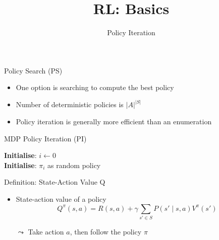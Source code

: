 \documentclass[aspectratio=169]{../latex_main/tntbeamer}  %
\title[Reinforcement Learning: Basics]{RL: Basics}
\subtitle{Policy Iteration}
\begin{document}
	
	\maketitle

\begin{frame}[c]{Policy Search (PS)}

\begin{itemize}
	\item One option is searching to compute the best policy
	\item Number of deterministic policies is $|A|^{|S|}$
	\item Policy iteration is generally more efficient than an enumeration
\end{itemize}

\end{frame}
\begin{frame}[c]{MDP Policy Iteration (PI)}

\begin{algorithm}[H]
  \caption{Policy Iteration}
  \DontPrintSemicolon
  \textbf{Initialise}: $i \leftarrow 0$\\
  \textbf{Initialise}: $\pi_i$ as random policy\\
\end{algorithm}

\end{frame}
\begin{frame}[c]{Definition: State-Action Value Q}

\begin{itemize}
	\item State-action value of a policy
	$$Q^\pi(s,a) = R(s,a) + \gamma \sum_{s' \in S} P(s' \mid s,a) V^\pi(s')$$
	\item[$\leadsto$] Take action $a$, then follow the policy $\pi$
\end{itemize}

\end{frame}
\end{document}
